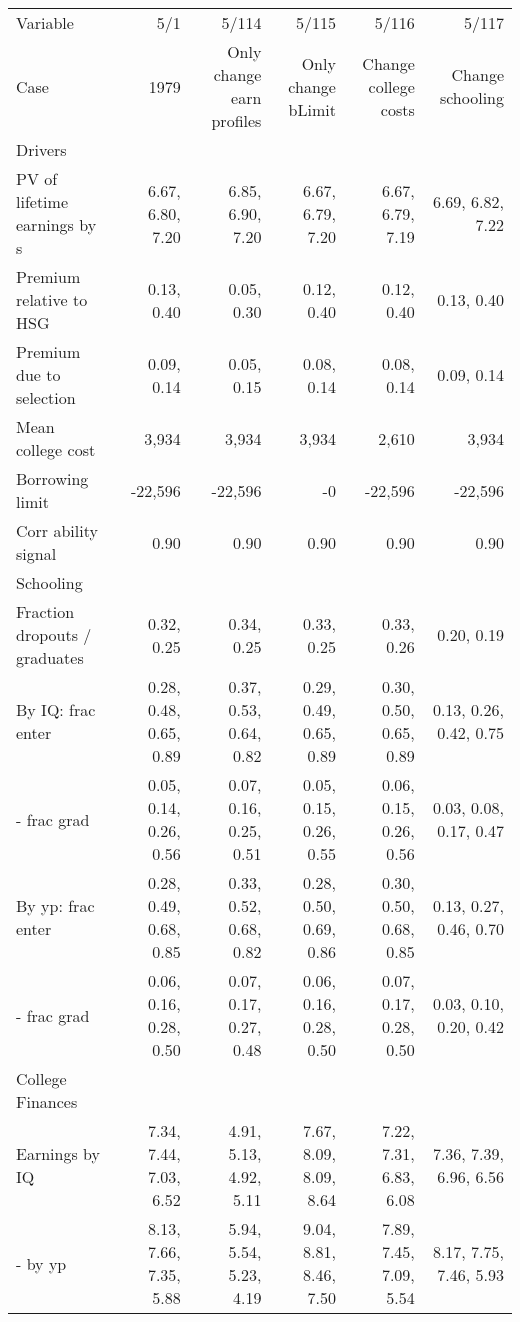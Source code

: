 \begin{tabular}{lrrrrr}
\hline
Variable & 5/1  & 5/114  & 5/115  & 5/116  & 5/117  \\ 
Case & 1979  & Only change earn profiles  & Only change bLimit  & Change college costs  & Change schooling  \\ 
Drivers &   &   &   &   &   \\ 
PV of lifetime earnings by s & 6.67, 6.80, 7.20  & 6.85, 6.90, 7.20  & 6.67, 6.79, 7.20  & 6.67, 6.79, 7.19  & 6.69, 6.82, 7.22  \\ 
Premium relative to HSG & 0.13, 0.40  & 0.05, 0.30  & 0.12, 0.40  & 0.12, 0.40  & 0.13, 0.40  \\ 
Premium due to selection & 0.09, 0.14  & 0.05, 0.15  & 0.08, 0.14  & 0.08, 0.14  & 0.09, 0.14  \\ 
Mean college cost & 3,934  & 3,934  & 3,934  & 2,610  & 3,934  \\ 
Borrowing limit & -22,596  & -22,596  & -0  & -22,596  & -22,596  \\ 
Corr ability signal & 0.90  & 0.90  & 0.90  & 0.90  & 0.90  \\ 
\hline
Schooling &   &   &   &   &   \\ 
Fraction dropouts / graduates & 0.32, 0.25  & 0.34, 0.25  & 0.33, 0.25  & 0.33, 0.26  & 0.20, 0.19  \\ 
By IQ: frac enter & 0.28, 0.48, 0.65, 0.89  & 0.37, 0.53, 0.64, 0.82  & 0.29, 0.49, 0.65, 0.89  & 0.30, 0.50, 0.65, 0.89  & 0.13, 0.26, 0.42, 0.75  \\ 
- frac grad & 0.05, 0.14, 0.26, 0.56  & 0.07, 0.16, 0.25, 0.51  & 0.05, 0.15, 0.26, 0.55  & 0.06, 0.15, 0.26, 0.56  & 0.03, 0.08, 0.17, 0.47  \\ 
By yp: frac enter & 0.28, 0.49, 0.68, 0.85  & 0.33, 0.52, 0.68, 0.82  & 0.28, 0.50, 0.69, 0.86  & 0.30, 0.50, 0.68, 0.85  & 0.13, 0.27, 0.46, 0.70  \\ 
- frac grad & 0.06, 0.16, 0.28, 0.50  & 0.07, 0.17, 0.27, 0.48  & 0.06, 0.16, 0.28, 0.50  & 0.07, 0.17, 0.28, 0.50  & 0.03, 0.10, 0.20, 0.42  \\ 
\hline
College Finances &   &   &   &   &   \\ 
Earnings by IQ & 7.34, 7.44, 7.03, 6.52  & 4.91, 5.13, 4.92, 5.11  & 7.67, 8.09, 8.09, 8.64  & 7.22, 7.31, 6.83, 6.08  & 7.36, 7.39, 6.96, 6.56  \\ 
- by yp & 8.13, 7.66, 7.35, 5.88  & 5.94, 5.54, 5.23, 4.19  & 9.04, 8.81, 8.46, 7.50  & 7.89, 7.45, 7.09, 5.54  & 8.17, 7.75, 7.46, 5.93  \\ 

\end{tabular}
